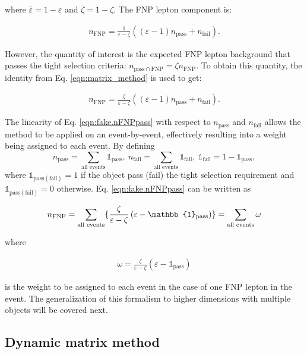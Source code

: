 where $\bar\varepsilon = 1 - \varepsilon$ and  $\bar\zeta = 1 - \zeta$. 
The FNP lepton component is: 

\begin{align}
n_\text{FNP} = \frac{1}{\varepsilon - \zeta}\left(\left(\varepsilon-1\right)n_\text{pass}+n_\text{fail}\right).
\label{eqn:fake.nfake}
\end{align}

However, the quantity of interest is the expected FNP lepton background that 
passes the tight selection criteria: 
$n_{\text{pass}~\cap~\text{FNP}} = \zeta n_\text{FNP}$.
 To obtain this quantity, 
the identity from Eq. \ref{eqn:matrix_method} is used to get:

\begin{align}
n_\text{FNP} = \frac{\zeta}{\varepsilon - \zeta}\left(\left(\varepsilon-1\right)n_\text{pass}+n_\text{fail}\right).
\label{eqn:fake.nFNPpass}
\end{align}

The linearity of Eq. \ref{eqn:fake.nFNPpass}  with respect to $n_\text{pass}$ 
and $n_\text{fail}$ allows the method to be applied on an event-by-event, 
effectively resulting into a weight being assigned to each event. 
By defining
\[
  n_\text{pass} = \sum_\text{all events} \mathbb{1}_\text{pass},~
  n_\text{fail} = \sum_\text{all events} \mathbb{1}_\text{fail},~ 
  \mathbb{1}_\text{fail} = 1 -  \mathbb{1}_\text{pass},
\]
where $\mathbb{1}_{\text{pass} \left(\text{fail}\right)} = 1$ if the object pass (fail) the tight selection requirement and $\mathbb{1}_{\text{pass}\left(\text{fail}\right)} = 0$ otherwise. Eq. \ref{eqn:fake.nFNPpass} can be written as


\[
n_\text{FNP} = \sum_\text{all events} \{
\frac{\zeta}{\varepsilon - \zeta}\left(\varepsilon - 
\mathbb{1}_\text{pass}\right)
\}
\\
=  \sum_\text{all events} \omega
\]

where 

\begin{align}
  \omega = \frac{\zeta}{\varepsilon - \zeta}\left(\varepsilon - 
\mathbb{1}_\text{pass}\right)
  \label{eqn:fake.nFNPpass.demo}
\end{align}

is the weight to be assigned to each event in the case of one FNP lepton 
in the event. 
The generalization of this formalism to higher dimensions 
with multiple objects will be covered next.



\subsection{Dynamic matrix method}


